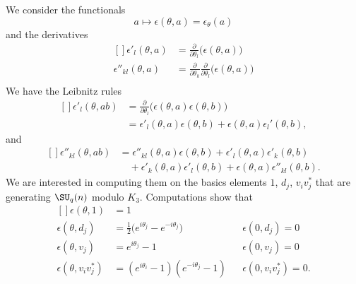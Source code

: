 We consider the functionals
\begin{equation}
    a\mapsto\epsilon(\theta,a)=\epsilon_{\theta}(a)
\end{equation}
and the derivatives
\begin{equation}
    \begin{aligned}[]
        \epsilon'_l(\theta,a)&=\frac{ \partial  }{ \partial \theta_l }\big( \epsilon(\theta,a) \big)\\
        \epsilon''_{kl}(\theta,a)&=\frac{ \partial  }{ \partial \theta_k }\frac{ \partial  }{ \partial \theta_l }\big( \epsilon(\theta,a) \big)\\
    \end{aligned}
\end{equation}
We have the Leibnitz rules
\begin{equation}
    \begin{aligned}[]
        \epsilon'_l(\theta,ab)&=\frac{ \partial  }{ \partial \theta_l }\big( \epsilon(\theta,a)\epsilon(\theta,b) \big)\\
        &=\epsilon'_l(\theta,a)\epsilon(\theta,b)+\epsilon(\theta,a)\epsilon_l'(\theta,b),
    \end{aligned}
\end{equation}
and
\begin{equation}        \label{EqLeibnitzepsppkl}
    \begin{aligned}[]
        \epsilon''_{kl}(\theta,ab)&=\epsilon''_{kl}(\theta,a)\epsilon(\theta,b)+\epsilon'_l(\theta,a)\epsilon'_k(\theta,b)\\
        &\quad+\epsilon'_k(\theta,a)\epsilon'_l(\theta,b)+\epsilon(\theta,a)\epsilon''_{kl}(\theta,b).
    \end{aligned}
\end{equation}
We are interested in computing them on the basics elements $1$, $d_j$, $v_iv_j^*$ that are generating $\SU_q(n)$ modulo $K_3$. Computations show that
\begin{equation}
    \begin{aligned}[]
        \epsilon(\theta,1)&=1\\
        \epsilon(\theta,d_j)&=\frac{ 1 }{2}\big(  e^{i\theta_j}- e^{-i\theta_j} \big)&&\epsilon(0,d_j)=0\\
        \epsilon(\theta,v_j)&= e^{i\theta_j}-1&&\epsilon(0,v_j)=0\\
        \epsilon(\theta,v_iv_j^*)&=( e^{i\theta_i}-1)( e^{-i\theta_j}-1)&&\epsilon(0,v_iv_j^*)=0.
    \end{aligned}
\end{equation}
